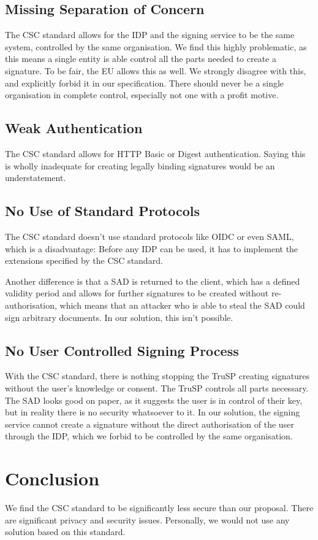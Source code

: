 \subsection{Missing Separation of Concern}
The \gls{CSC} standard allows for the \gls{IDP} and the signing service to be the same system,
controlled by the same organisation.
We find this highly problematic, as this means a single entity is able control all the parts needed to create a signature.
To be fair, the \gls{EU} allows this as well.
We strongly disagree with this, and explicitly forbid it in our specification.
There should never be a single organisation in complete control, especially not one with a profit motive.

\subsection{Weak Authentication}
The \gls{CSC} standard allows for \gls{HTTP} Basic or Digest authentication.
Saying this is wholly inadequate for creating legally binding signatures would be an understatement.

\subsection{No Use of Standard Protocols}
The \gls{CSC} standard doesn't use standard protocols like \gls{OIDC} or even \gls{SAML},
which is a disadvantage:
Before any \gls{IDP} can be used, it has to implement the extensions specified by the \gls{CSC} standard.

Another difference is that a \gls{SAD} is returned to the client,
which has a defined validity period and allows for further signatures to be created without re-authorisation,
which means that an attacker who is able to steal the \gls{SAD} could sign arbitrary documents.
In our solution, this isn't possible.

\subsection{No User Controlled Signing Process}
With the \gls{CSC} standard, there is nothing stopping the \gls{TruSP} creating signatures without the user's knowledge or consent.
The \gls{TruSP} controls all parts necessary.
The \gls{SAD} looks good on paper,
as it suggests the user is in control of their key,
but in reality there is no security whatsoever to it.
In our solution, the signing service cannot create a signature without the direct authorisation of the user through the \gls{IDP},
which we forbid to be controlled by the same organisation.

\section{Conclusion}\label{sec:conclusion}
We find the \gls{CSC} standard to be significantly less secure than our proposal.
There are significant privacy and security issues.
Personally, we would not use any solution based on this standard.
